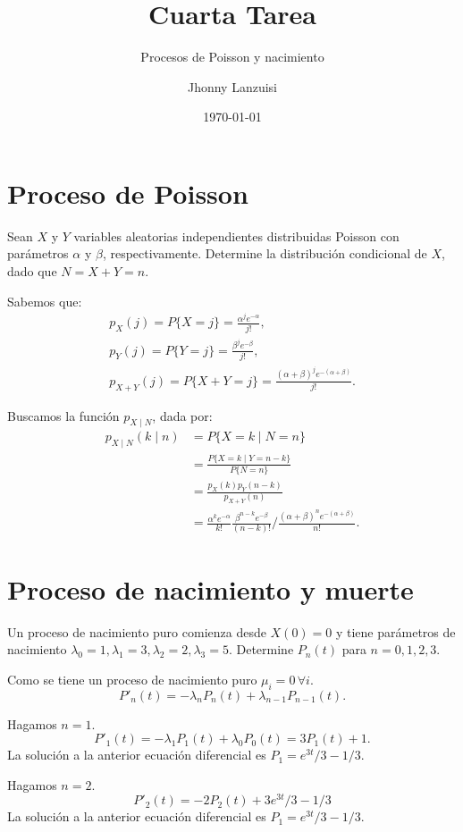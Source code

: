 \documentclass{scrartcl}
\begin{document}
%
\title{Cuarta Tarea}
\subtitle{Procesos de Poisson y nacimiento}
\subject{Aplicación a los procesos estocásticos discretos}
\titlehead{Universidad Simón Bolívar\hfill Caracas, Venezuela}
\author{Jhonny Lanzuisi}
\date{\today}
\maketitle

\section*{Proceso de Poisson}
\exercise
Sean $X$ y $Y$ variables aleatorias independientes distribuidas Poisson con parámetros $α$ y $β$, 
respectivamente. Determine la distribución condicional de $X$, dado que $N = X + Y = n$.

\solution
Sabemos que: 
\begin{gather*}
    p_X(j) = P\{X=j\} = \frac{\alpha^j e^{-\alpha}}{j!},\\
    p_Y(j) = P\{Y=j\} = \frac{\beta^j e^{-\beta}}{j!},\\
    p_{X+Y}(j) = P\{{X+Y}=j\} = \frac{(\alpha+\beta)^j e^{-(\alpha+\beta)}}{j!}.
\end{gather*}

Buscamos la función $p_{X\mid N}$, dada por:
\begin{align*}
    p_{X\mid N}(k\mid n) &= P\{X = k\mid N = n\}\\
                         &= \frac{P\{X = k\mid Y = n-k\}}{P\{N = n\}}\\
                         &= \frac{p_X(k) p_Y(n-k)}{p_{X+Y}(n)}\\
                         &= \frac{\alpha^k e^{-\alpha}}{k!}\frac{\beta^{n-k} e^{-\beta}}{(n-k)!}
                                \bigg/ \frac{(\alpha+\beta)^n e^{-(\alpha+\beta)}}{n!}.
\end{align*}

\section*{Proceso de nacimiento y muerte}
\setcounter{exer}{0}
\exercise
Un proceso de nacimiento puro comienza desde $X(0) = 0$ y tiene parámetros de nacimiento 
$λ_0 = 1, λ_1 = 3, λ_2 = 2, λ_3 = 5$. Determine $P_n (t)$ para $n = 0, 1, 2, 3$.

\solution
Como se tiene un proceso de nacimiento puro $\mu_i = 0 \,\forall i$.
\[
    P'_n(t) = -\lambda_n P_n(t) + \lambda_{n-1} P_{n-1}(t).
\]

Hagamos $n=1$. 
\[
  P'_1(t) = -\lambda_1 P_1(t) + \lambda_0 P_{0}(t) = 3P_1(t) + 1.
\]
La solución a la anterior ecuación diferencial es $P_1 = e^{3t}/3 - 1/3$.

Hagamos $n=2$. 
\[
  P'_2(t) = -2 P_2(t) + 3 e^{3t}/3 - 1/3
\]
La solución a la anterior ecuación diferencial es $P_1 = e^{3t}/3 - 1/3$.

\end{document}
